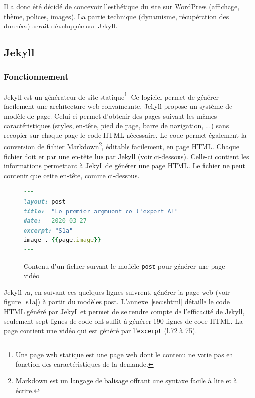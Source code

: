 Il a donc été décidé de concevoir l'esthétique du site sur WordPress (affichage, thème, polices, images). La partie technique (dynamisme, récupération des données) serait développée sur Jekyll.

\subsection{Jekyll}
\subsubsection{Fonctionnement}
Jekyll est un générateur de site statique\footnote{Une page web statique est une page web dont le contenu ne varie pas en fonction des caractéristiques de la demande.}. Ce logiciel permet de générer facilement une architecture web convaincante. Jekyll propose un système de modèle de page. Celui-ci permet d'obtenir des pages suivant les mêmes caractéristiques (styles, en-tête, pied de page, barre de navigation, ...) sans recopier sur chaque page le code HTML nécessaire. Le code permet également la conversion de fichier Markdown\footnote{Markdown est un langage de balisage offrant une syntaxe facile à lire et à écrire.}, éditable facilement, en page HTML. Chaque fichier doit er par une en-tête lue par Jekyll (voir ci-dessous). Celle-ci contient les informations permettant à Jekyll de générer une page HTML. Le fichier ne peut contenir que cette en-tête, comme ci-dessous.
\begin{figure}[!ht]
\begin{lstlisting}[language=Ruby]
---
layout: post
title:  "Le premier argmuent de l'expert A!"
date:   2020-03-27
excerpt: "S1a"
image : {{page.image}}
---
\end{lstlisting}
\caption*{Contenu d'un fichier suivant le modèle \texttt{post} pour générer une page vidéo}
\end{figure}

Jekyll va, en suivant ces quelques lignes suivrent, générer la page web (voir figure~\ref{s1a}) à partir du modèles post. L'annexe~\ref{sec:shtml} détaille le code HTML généré par Jekyll et permet de se rendre compte de l'efficacité de Jekyll, seulement sept lignes de code ont suffit à générer 190 lignes de code HTML. La page contient une vidéo qui est généré par l'\texttt{excerpt} (l.72 à 75).

